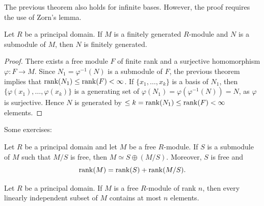 The previous theorem also holds for infinite bases. However, 
the proof requires the use of Zorn's lemma. 
	



\begin{corollary}
Let $R$ be a principal domain. If $M$ is a finitely generated $R$-module and $N$ 
is a submodule of $M$, then $N$ is finitely generated.   
\end{corollary}

\begin{proof}
There exists a free module $F$ of finite rank and a surjective homomorphism
$\varphi\colon F\to M$. Since $N_1=\varphi^{-1}(N)$ is a submodule of $F$, 
the previous theorem implies that  
$\operatorname{rank}(N_1)\leq\operatorname{rank}(F)<\infty$. If $\{x_1,\dots,x_k\}$ is a basis of $N_1$, then
$\{\varphi(x_1),\dots,\varphi(x_k)\}$ is a generating set of 
$\varphi(N_1)=\varphi(\varphi^{-1}(N))=N$, as 
$\varphi$ is surjective. Hence $N$ is generated by 
$\leq k=\operatorname{rank}(N_1)\leq\operatorname{rank}(F)<\infty$ elements.  
\end{proof}

Some exercises:

\begin{exercise}
\label{xca:rank}
    Let $R$ be a principal domain and 
    let $M$ be a free $R$-module. If $S$ is a submodule of $M$ such that
    $M/S$ is free, then $M\simeq S\oplus (M/S)$. Moreover,  
	$S$ is free and 
	\[
	\operatorname{rank}(M)=\operatorname{rank}(S)+\operatorname{rank}(M/S).
	\] 
\end{exercise}

\begin{exercise}
\label{xca:n_elements}
    Let $R$ be a principal domain. 
    If $M$ is a free $R$-module of rank $n$, then
    every linearly independent subset of $M$ 
    contains at most $n$ elements. 
\end{exercise}


